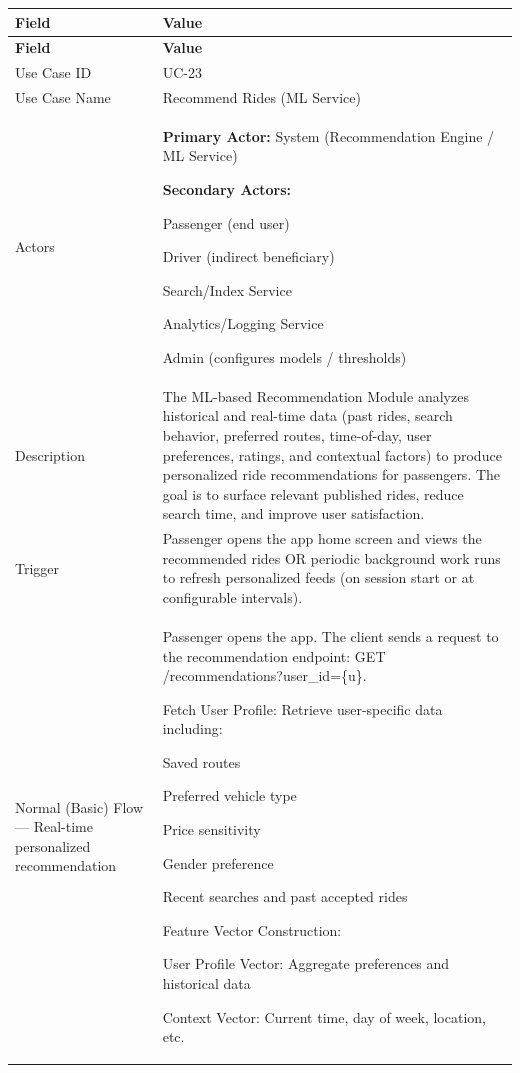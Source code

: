 \begin{longtable}{|p{3.5cm}|p{12cm}|}
\hline
\rowcolor{lightgray!30}
\textbf{Field} & \textbf{Value} \\
\hline
\endfirsthead
\hline
\rowcolor{lightgray!30}
\textbf{Field} & \textbf{Value} \\
\hline
\endhead
\hline
\endfoot
Use Case ID & UC-23 \\
\hline
Use Case Name & Recommend Rides (ML Service) \\
\hline
Actors &
\textbf{Primary Actor:} System (Recommendation Engine / ML Service)

\textbf{Secondary Actors:}

Passenger (end user)

Driver (indirect beneficiary)

Search/Index Service

Analytics/Logging Service

Admin (configures models / thresholds) \\
\hline
Description &
The ML-based Recommendation Module analyzes historical and real-time data (past rides, search behavior, preferred routes, time-of-day, user preferences, ratings, and contextual factors) to produce personalized ride recommendations for passengers. The goal is to surface relevant published rides, reduce search time, and improve user satisfaction. \\
\hline
Trigger &
Passenger opens the app home screen and views the recommended rides OR periodic background work runs to refresh personalized feeds (on session start or at configurable intervals). \\
\hline
Normal (Basic) Flow — Real-time personalized recommendation &
Passenger opens the app. The client sends a request to the recommendation endpoint: GET /recommendations?user\_id=\{u\}.

Fetch User Profile: Retrieve user-specific data including:

Saved routes

Preferred vehicle type

Price sensitivity

Gender preference

Recent searches and past accepted rides

Feature Vector Construction:

User Profile Vector: Aggregate preferences and historical data

Context Vector: Current time, day of week, location, etc.


\end{longtable}
